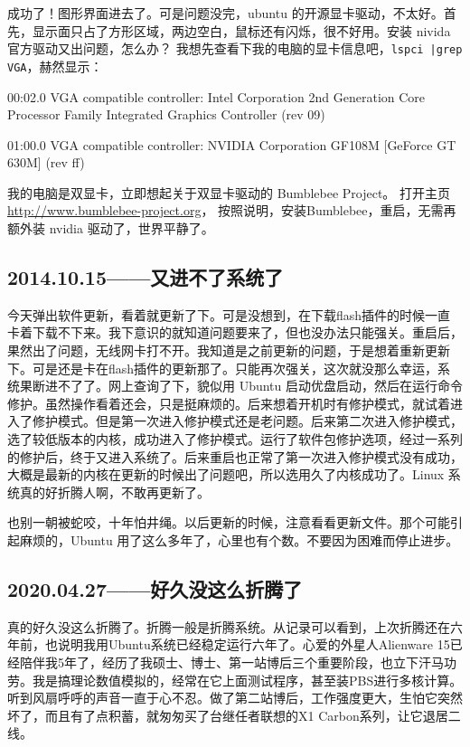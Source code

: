 \documentclass[cn,11pt,chinese,twoside]{elegantbook}
\begin{document}
成功了！图形界面进去了。可是问题没完，ubuntu 的开源显卡驱动，不太好。首先，显示面只占了方形区域，两边空白，鼠标还有闪烁，很不好用。安装 nivida 官方驱动又出问题，怎么办？ 我想先查看下我的电脑的显卡信息吧，\verb[lspci |grep VGA[，赫然显示：

00:02.0 VGA compatible controller: Intel Corporation 2nd Generation Core Processor Family Integrated Graphics Controller (rev 09)

01:00.0 VGA compatible controller: NVIDIA Corporation GF108M [GeForce GT 630M] (rev ff)

我的电脑是双显卡，立即想起关于双显卡驱动的 Bumblebee Project。 打开主页 \url{http://www.bumblebee-project.org}， 按照说明，安装Bumblebee，重启，无需再额外装 nvidia 驱动了，世界平静了。


\subsection*{2014.10.15——又进不了系统了}
今天弹出软件更新，看着就更新了下。可是没想到，在下载flash插件的时候一直卡着下载不下来。我下意识的就知道问题要来了，但也没办法只能强关。重启后，果然出了问题，无线网卡打不开。我知道是之前更新的问题，于是想着重新更新下。可是还是卡在flash插件的更新那了。只能再次强关，这次就没那么幸运，系统果断进不了了。网上查询了下，貌似用 Ubuntu  启动优盘启动，然后在运行命令修护。虽然操作看着还会，只是挺麻烦的。后来想着开机时有修护模式，就试着进入了修护模式。但是第一次进入修护模式还是老问题。后来第二次进入修护模式，选了较低版本的内核，成功进入了修护模式。运行了软件包修护选项，经过一系列的修护后，终于又进入系统了。后来重启也正常了第一次进入修护模式没有成功，大概是最新的内核在更新的时候出了问题吧，所以选用久了内核成功了。Linux 系统真的好折腾人啊，不敢再更新了。

也别一朝被蛇咬，十年怕井绳。以后更新的时候，注意看看更新文件。那个可能引起麻烦的，Ubuntu 用了这么多年了，心里也有个数。不要因为困难而停止进步。



\subsection*{2020.04.27——好久没这么折腾了}
真的好久没这么折腾了。折腾一般是折腾系统。从记录可以看到，上次折腾还在六年前，也说明我用Ubuntu系统已经稳定运行六年了。心爱的外星人Alienware 15已经陪伴我5年了，经历了我硕士、博士、第一站博后三个重要阶段，也立下汗马功劳。我是搞理论数值模拟的，经常在它上面测试程序，甚至装PBS进行多核计算。听到风扇呼呼的声音一直于心不忍。做了第二站博后，工作强度更大，生怕它突然坏了，而且有了点积蓄，就匆匆买了台继任者联想的X1 Carbon系列，让它退居二线。
\end{document}
